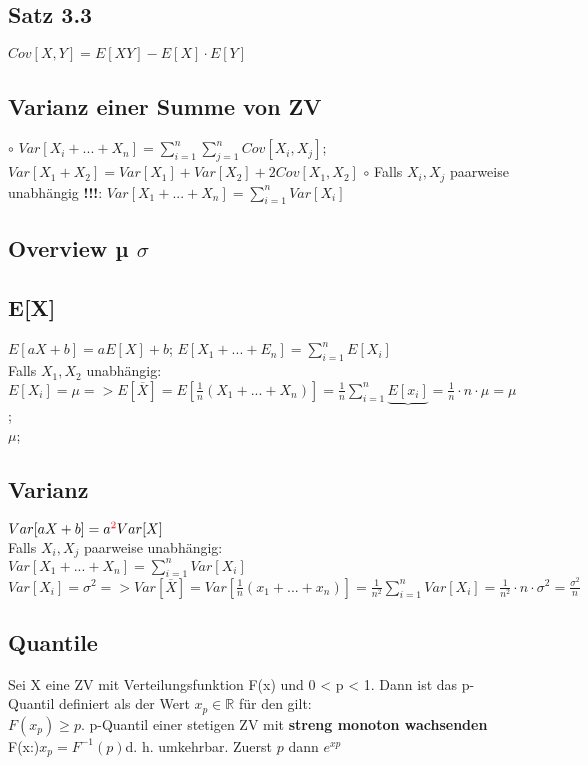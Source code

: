 \subsection{Satz 3.3}
$Cov[X, Y] = E[XY] - E[X] \cdot E[Y]$\\
\subsection{Varianz einer Summe von ZV}
  $\circ$ $Var[X_{i} + ... + X_{n}] = \sum_{i=1}^{n} \sum_{j=1}^{n} Cov[X_{i}, X_{j}]$; 
  $Var[X_{1} + X_{2}] = Var[X_{1}] + Var[X_{2}] + 2Cov[X_{1}, X_{2}]$
  $\circ$ Falls $X_{i} , X_{j}$ paarweise unabhängig \textbf{!!!}: $Var[X_{1} + ...+ X_{n}] = \sum_{i=1}^{n} Var[X_{i}]$
\subsection{Overview µ $\sigma$}
\subsection{E[X]}
$ E[aX + b] = aE[X]+b $; 
$ E[X_{1}+ ...+ E_{n}] = \sum_{i=1}^{n} E[X_{i}]$\\
Falls $X_{1}, X_{2}$ unabhängig:\\
$E[X_{i}] = \mu => E[\overline{X}] = E[\frac{1}{n}(X_{1} + ...+ X_{n})] =  \frac{1}{n}\sum_{i=1}^{n} \underbrace{E[x_{i}]} = \frac{1}{n}\cdot n \cdot \mu = \mu$;\\
$ \mu $; 
\subsection{Varianz}
$Var[aX + b] = a\textcolor{red}{^2}Var[X]$\\
Falls $X_{i}, X_{j}$ paarweise unabhängig:\\
$Var[X_{1} + ... + X_{n}] = \sum_{i=1}^{n} Var[X_{i}]$\\
$Var[X_{i}] = \sigma^2 => Var[\overline{X}] = Var[\frac{1}{n}(x_{1} + ... + x_{n})] = \frac{1}{n^2} \sum_{i=1}^{n} Var[X_{i}] = \frac{1}{n^2} \cdot n \cdot \sigma^2 = \frac{\sigma^2}{n}$
\subsection{Quantile}
Sei X eine ZV mit Verteilungsfunktion F(x) und 0 < p < 1. Dann ist das p-Quantil definiert als der Wert $x_{p} \in \mathbb{R}$ für den gilt:\\
$F(x_{p}) \ge p.$ p-Quantil einer stetigen ZV mit \textbf{streng monoton wachsenden} F(x:)$x_{p} = F^{-1}(p)$d. h. umkehrbar. Zuerst $ p $ dann $e^{xp} $